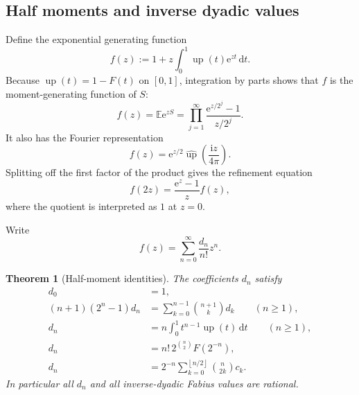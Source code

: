 \documentclass[11pt]{article}
\numberwithin{equation}{section}
\newtheorem{theorem}{Theorem}[section]
\theoremstyle{definition}
\theoremstyle{remark}
\newcommand{\upf}{\operatorname{up}}
\newcommand{\dd}{\,\mathrm d}
\newcommand{\e}{\mathrm e}
\newcommand{\ii}{\mathrm i}
\newcommand{\floor}[1]{\left\lfloor#1\right\rfloor}
\begin{document}
\subsection{Half moments and inverse dyadic values}

Define the exponential generating function
\begin{equation}\label{eq:f-generating}
 f(z):=1+z\int_0^1\upf(t)\e^{zt}\dd t.
\end{equation}
Because $\upf(t)=1-F(t)$ on $[0,1]$, integration by parts shows that $f$ is the moment-generating function of $S$:
\begin{equation}\label{eq:f-mgf}
 f(z)=\mathbb E\e^{zS}
     =\prod_{j=1}^{\infty}\frac{\e^{z/2^j}-1}{z/2^j}.
\end{equation}
It also has the Fourier representation
\begin{equation}\label{eq:f-Fourier}
 f(z)=\e^{z/2}\widehat{\upf}\!\left(\frac{\ii z}{4\pi}\right).
\end{equation}
Splitting off the first factor of the product gives the refinement equation
\begin{equation}\label{eq:f-refinement}
 f(2z)=\frac{\e^z-1}{z}f(z),
\end{equation}
where the quotient is interpreted as $1$ at $z=0$.

Write
\begin{equation}\label{eq:d-generating}
 f(z)=\sum_{n=0}^{\infty}\frac{d_n}{n!}z^n.
\end{equation}

\begin{theorem}[Half-moment identities]\label{thm:moment-identities}
The coefficients $d_n$ satisfy
\begin{align}
 d_0&=1,\label{eq:d0}\\
 (n+1)(2^n-1)d_n
 &=\sum_{k=0}^{n-1}\binom{n+1}{k}d_k\qquad(n\ge1),\label{eq:d-recurrence}\\
 d_n&=n\int_0^1t^{n-1}\upf(t)\dd t\qquad(n\ge1),\label{eq:d-half-moment}\\
 d_n&=n!\,2^{\binom n2}F(2^{-n}),\label{eq:d-inverse-dyadic}\\
 d_n&=2^{-n}\sum_{k=0}^{\floor{n/2}}\binom n{2k}c_k.\label{eq:d-from-c}
\end{align}
In particular all $d_n$ and all inverse-dyadic Fabius values are rational.
\end{theorem}
\end{document}

